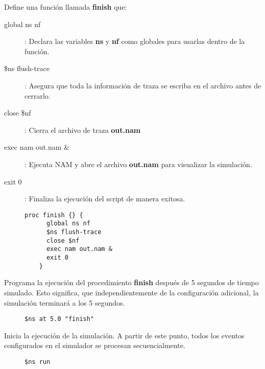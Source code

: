 \newpage

Define una funci\'on llamada \textbf{finish} que:
\begin{description}
  \item[global ns nf] : Declara las variables \textbf{ns} y \textbf{nf} como globales para usarlas dentro de la funci\'on.
  \item[\$ns flush-trace] : Asegura que toda la informaci\'on de traza se escriba en el archivo antes de cerrarlo.
  \item[close \$nf] : Cierra el archivo de traza \textbf{out.nam}
  \item[exec nam out.nam \&] : Ejecuta NAM y abre el archivo \textbf{out.nam} para visualizar la simulaci\'on.
  \item[exit 0] : Finaliza la ejecuci\'on del script de manera exitosa.      
\end{description}
\begin{figure}[H]
  \centering
  \begin{lstlisting}[frame=single, breaklines=true, basicstyle=\footnotesize\ttfamily, breakatwhitespace=false, 
    columns=flexible, tabsize=2, showstringspaces=false]
    proc finish {} {
      global ns nf
      $ns flush-trace
      close $nf
      exec nam out.nam &
      exit 0
    }
  \end{lstlisting}
\end{figure}

Programa la ejecuci\'on del procedimiento \textbf{finish} despu\'es de 5 segundos de tiempo simulado. Esto significa, que 
independientemente de la configuraci\'on adicional, la simulaci\'on terminar\'a a los 5 segundos.
\begin{figure}[H]
  \centering
  \begin{lstlisting}[frame=single, breaklines=true, basicstyle=\footnotesize\ttfamily, breakatwhitespace=false, 
    columns=flexible, tabsize=2, showstringspaces=false]
    $ns at 5.0 "finish"
  \end{lstlisting}
\end{figure}

Inicia la ejecuci\'on de la simulaci\'on. A partir de este punto, todos los eventos configurados en el simulador 
se procesan secuencialmente.
\begin{figure}[H]
  \centering
  \begin{lstlisting}[frame=single, breaklines=true, basicstyle=\footnotesize\ttfamily, breakatwhitespace=false, 
    columns=flexible, tabsize=2, showstringspaces=false]
    $ns run
  \end{lstlisting}
\end{figure}

